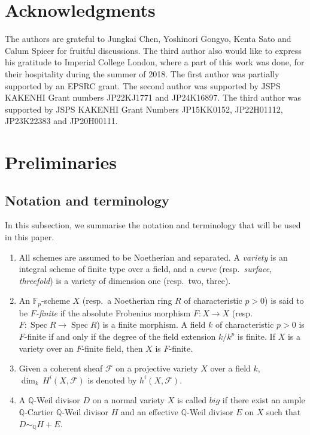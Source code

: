 \documentclass[12pt]{amsart}
\def\Spec{\operatorname{Spec}}
\newcommand{\Q}{\mathbb{Q}}
\theoremstyle{plain}
\theoremstyle{definition}
\theoremstyle{remark}
\newtheorem{defn and notation}[thm]{Definition and Notation}
\theoremstyle{plain}
\begin{document}
\section*{Acknowledgments}
The authors are grateful to Jungkai Chen, Yoshinori Gongyo,  Kenta Sato and Calum Spicer for fruitful discussions. 
The third author also would like to express his gratitude to Imperial College London, where a part of this work was done, for their hospitality during the summer of 2018. 
The first author was partially supported by an EPSRC grant. 
The second author was supported by JSPS KAKENHI Grant numbers JP22KJ1771 and JP24K16897.
The third author was supported by JSPS KAKENHI Grant Numbers JP15KK0152, JP22H01112, JP23K22383 and JP20H00111. 



\section{Preliminaries}

\subsection{Notation and terminology}

In this subsection, we summarise the notation and terminology that will be used in this paper. 
\begin{enumerate}
\item 
All schemes are assumed to be Noetherian and separated. 
A \textit{variety} is an integral scheme of finite type over a field, and a \textit{curve} (resp.~\textit{surface}, \textit{threefold}) is a variety of dimension one (resp.~two, three). 
\item 
An $\mathbb{F}_p$-scheme $X$ (resp.~a Noetherian ring $R$ of characteristic $p>0$) is said to be \textit{$F$-finite} if the absolute Frobenius morphism $F\colon  X \to X$ (resp. $F\colon \Spec R \to \Spec R$) is a finite morphism. 
A field $k$ of characteristic $p>0$ is $F$-finite if and only if the degree of the field extension $k/k^p$ is finite. 
If $X$ is a variety over an $F$-finite field, then $X$ is $F$-finite. 
\item Given a coherent sheaf $\mathcal{F}$ on a projective variety $X$ over a field $k$, $\dim_{k}\,H^i(X,\mathcal{F})$ is denoted by $h^i(X,\mathcal{F})$. 
\item A $\Q$-Weil divisor $D$ on a normal variety $X$ is called $\textit{big}$ if there exist an ample $\Q$-Cartier $\Q$-Weil divisor $H$ and an effective $\Q$-Weil divisor $E$ on $X$ such that $D \sim_{\Q} H+E$. 
\end{enumerate}
\end{document}
